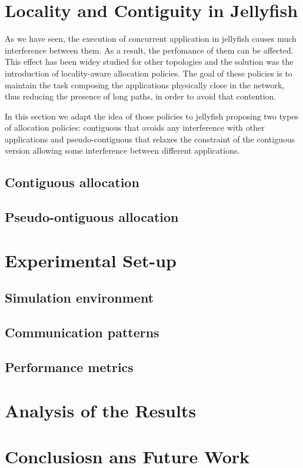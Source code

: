 \documentclass{sig-alternate}
\begin{document}
\section{Locality and Contiguity in Jellyfish}
\label{locality}

As we have seen, the execution of concurrent application in jellyfish causes much interference between them. As a result, the perfomance of them can be affected. This effect has been widey studied for other topologies and the solution was the introduction of locality-aware allocation policies. The goal of these policies is to maintain the task composing the applications physically close in the network, thus reducing the presence of long paths, in order to avoid that contention. 

In this section we adapt the idea of those policies to jellyfish proposing two types of allocation policies: contiguous that avoids any interference with other applications and pseudo-contiguous that relaxes the constraint of the contiguous version allowing some interference between different applications. 

\subsection{Contiguous allocation}
\label{contiguous}

\subsection{Pseudo-ontiguous allocation}
\label{contiguous}




\section{Experimental Set-up}
\label{experimental}

\subsection{Simulation environment}
\label{subsec:simulation}


\subsection{Communication patterns}
\label{subsec:communication}

\subsection{Performance metrics}
\label{subsec:performance}


\section{Analysis of the Results}
\label{analysis}

\section{Conclusiosn ans Future Work}
\label{conclusions}




\end{document}
